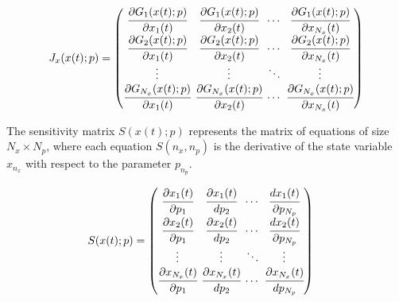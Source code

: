 \documentclass[../Article_Model_Parameters.tex]{subfiles}
\begin{document}
	{\footnotesize
		\begin{align}
			\begingroup %
			\setlength\arraycolsep{2pt}
			{J_x}({x}(t);{p})=\begin{pmatrix}
				\cfrac{\partial {G_{1}}({x}(t);{p})}{\partial {x_{1}}(t)} & \cfrac{\partial {G_{1}}({x}(t);{p})}{\partial {x_{2}}(t)} & \cdots & \cfrac{\partial {G_{1}}({x}(t);{p})}{\partial {x_{N_x}}(t)}\\
				\cfrac{\partial {G_{2}}({x}(t);{p})}{\partial {x_{1}}(t)} & \cfrac{\partial {G_{2}}({x}(t);{p})}{\partial {x_{2}}(t)} & \cdots & \cfrac{\partial {G_{2}}({x}(t);{p})}{\partial {x_{N_x}}(t)}\\
				\vdots & \vdots & \ddots & \vdots\\ 
				\cfrac{\partial {G_{N_x}}({x}(t);{p})}{\partial {x_{1}}(t)} & \cfrac{\partial {G_{N_x}}({x}(t);{p})}{\partial {x_{2}}(t)} & \cdots & \cfrac{\partial {G_{N_x}}({x}(t);{p})}{\partial {x_{N_x}}(t)}\\
			\end{pmatrix}
			\endgroup
	\end{align} }
	
	The sensitivity matrix ${S}({x}(t);{p})$ represents the matrix of equations of size $N_x \times N_p$, where each equation ${S}(n_x,n_p)$ is the derivative of the state variable $x_{n_x}$ with respect to the parameter $p_{n_p}$.
	
	{\footnotesize
		\begin{equation}
			\begin{split}
				{S}({x}(t);{p}) & = 
				\begingroup %
				\setlength\arraycolsep{2pt}
				\begin{pmatrix}
					\cfrac{\partial {x_{1}}(t)}{\partial {p_{1}}} 	& \cfrac{\partial {x_{1}}(t)}{d {p_{2}}}     & \cdots & \cfrac{d {x_{1}}(t)}{\partial {p_{N_p}}}\\
					\cfrac{\partial {x_{2}}(t)}{\partial {p_{1}}} 	& \cfrac{\partial {x_{2}}(t)}{d {p_{2}}}     & \cdots & \cfrac{d {x_{2}}(t)}{\partial {p_{N_p}}}\\
					\vdots					 	    & \vdots 					   	  & \ddots & \vdots\\
					\cfrac{\partial {x_{N_x}}(t)}{\partial {p_{1}}} 	& \cfrac{\partial {x_{N_x}}(t)}{d {p_{2}}}     & \cdots & \cfrac{\partial {x_{N_x}}(t)}{d {p_{N_p}}}
				\end{pmatrix} 
				\endgroup
			\end{split}
	\end{equation} }
	
\end{document}
